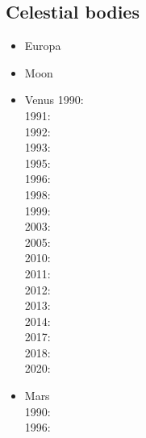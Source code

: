 {\scriptsize
\noindent
\cite{laqu86}
\cite{rotf90}
\cite{frha93}
\cite{elgo94}
\cite{cheb96}\cite{elma96}
\cite{brpv97}
\cite{lixu01}
\cite{dogs06}\cite{lica06}
\cite{hoow17}
}

\subsection{Celestial bodies}

\begin{itemize}
\item Europa 
{\scriptsize
\cite{shha04,shha05,mish05,hash08}\cite{hash10}\cite{hash11,kast14,almc19}
}
\item Moon 
{\scriptsize
\cite{elvh02}\cite{elhg04}\cite{devv10}\cite{dejv13} \cite{zhdv19}
} 
\item Venus 
{\scriptsize
1990: \cite{scbg90,ogaw00}\\
1991: \cite{lekb91}\\
1992: \cite{kiha92,sqjs92}\\
1993: \cite{kief93,lekb93,ogaw93}\\
1995: \cite{lekb95,mopa95}\\
1996: \cite{somo96}\\
1998: \cite{mazk98}\cite{resm98}\cite{moso98}\cite{phha98}\\
1999: \cite{resm99}\\
2003: \cite{vesh03}\\
2005: \cite{vavv05}\\
2010: \cite{stfh10}\\
2011: \cite{orso11}\\
2012: \cite{arta12}\\
2013: \cite{huyz13}\\
2014: \cite{gita14}\cite{gery14b}\\
2017: \cite{cram17}\cite{dast17}\\
2018: \cite{king18}\\
2020: \cite{weki20}
}
\item Mars \\
{\scriptsize
1990: \cite{scbg90}\\
1996: \cite{hach96}\\
}
\end{itemize}
